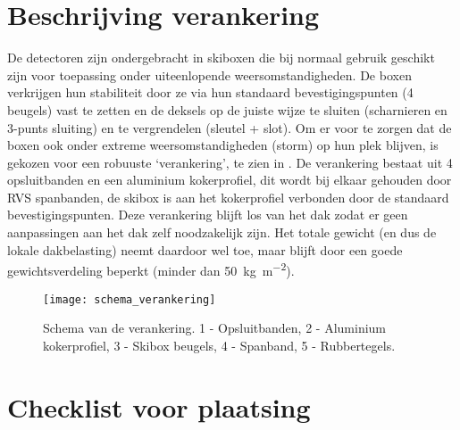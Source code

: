 \section{Beschrijving verankering}

De \hisparc detectoren zijn ondergebracht in skiboxen die bij normaal
gebruik geschikt zijn voor toepassing onder uiteenlopende
weersomstandigheden. De boxen verkrijgen hun stabiliteit door ze via hun
standaard bevestigingspunten (4 beugels) vast te zetten en de deksels op
de juiste wijze te sluiten (scharnieren en 3-punts sluiting) en te
vergrendelen (sleutel + slot). Om er voor te zorgen dat de boxen ook
onder extreme weersomstandigheden (storm) op hun plek blijven, is
gekozen voor een robuuste ‘verankering’, te zien in
. De verankering bestaat uit 4
opsluitbanden en een aluminium kokerprofiel, dit wordt bij
elkaar gehouden door RVS spanbanden, de skibox is aan het
kokerprofiel verbonden door de standaard bevestigingspunten. Deze
verankering blijft los van het dak zodat er geen aanpassingen aan het
dak zelf noodzakelijk zijn. Het totale gewicht (en dus de lokale
dakbelasting) neemt daardoor wel toe, maar blijft door een goede
gewichtsverdeling beperkt (minder dan
\SI{50}{\kilo\gram\per\square\meter}).

\begin{figure}
    \centering
    \texttt{[image: schema\_verankering]}
    \caption{Schema van de verankering. 1 - Opsluitbanden, 2 - Aluminium
             kokerprofiel, 3 - Skibox beugels, 4 - Spanband, 5 -
             Rubbertegels.}
    \label{fig:schema_verankering}
\end{figure}



\section{Checklist voor plaatsing}

